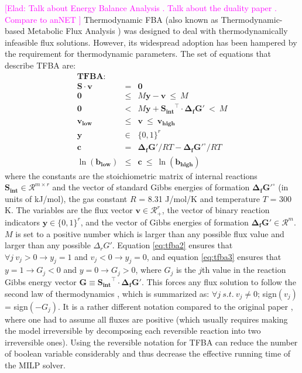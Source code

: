 \documentclass[twocolumn]{bmcart}%
\newcommand{\elad}[1]{{\textcolor{magenta}{[Elad: {#1}]}}}
\newcommand{\Sint}{\mathbf{S_{int}}}
\begin{document}
\elad{Talk about Energy Balance Analysis \cite{Beard2002-xt}. Talk about the duality paper \cite{Warren2007-wm}. Compare to anNET \cite{Matthias2008, Kuemmel2006}}
Thermodynamic FBA (also known as Thermo\-dynamic-based Metabolic Flux Analysis \cite{Henry2007-xp}) was designed to deal with thermodynamically infeasible flux solutions. However, its widespread adoption has been hampered by the requirement for thermodynamic parameters. The set of equations that describe TFBA are:
\begin{eqnarray}
\textbf{TFBA:} && \nonumber\\
\mathbf{S} \cdot \mathbf{v} &=& \mathbf{0}  \label{eq:tfba1} \\
\mathbf{0} &\leq& M \mathbf{y} - \mathbf{v} ~\leq~ M
\label{eq:tfba2} \\
\mathbf{0} &<& M \mathbf{y} + \Sint^\top \cdot \mathbf{\Delta_f G'} ~<~ M \label{eq:tfba3} \\
\mathbf{v_{low}} &\leq& \mathbf{v} ~\leq~ \mathbf{v_{high}} \label{eq:tfba4}\\
\mathbf{y} &\in& \{0, 1\}^r \label{eq:tfba5}\\
\mathbf{c} &=& \mathbf{\Delta_f G'}/RT - \mathbf{\Delta_f G'^\circ}/RT \label{eq:tfba6}\\
\ln(\mathbf{b_{low}}) &\leq& \mathbf{c} ~\leq~ \ln(\mathbf{b_{high}}) \label{eq:tfba7}
\end{eqnarray}
where the constants are the stoichiometric matrix of internal reactions $\Sint \in \mathcal{R}^{m \times r}$  and the vector of standard Gibbs energies of formation $\mathbf{\Delta_f G'^\circ}$ (in units of kJ/mol), the gas constant $R$ = 8.31 J/mol/K and temperature $T$ = 300 K. The variables are the flux vector $\mathbf{v} \in \mathcal{R}_{+}^{r}$, the vector of binary reaction indicators $\mathbf{y} \in \{0,1\}^{r}$, and the vector of Gibbs energies of formation $\mathbf{\Delta_f G'} \in \mathcal{R}^{m}$. $M$ is set to a positive number which is larger than any possible flux value and larger than any possible $\Delta_r G'$. Equation \ref{eq:tfba2} ensures that $\forall j~v_j > 0 \rightarrow y_j = 1$ and $v_j < 0 \rightarrow y_j = 0$, and equation \ref{eq:tfba3} ensures that $y = 1 \rightarrow G_j < 0$ and $y = 0 \rightarrow G_j > 0$, where $G_j$ is the $j$th value in the reaction Gibbs energy vector $\mathbf{G} \equiv \Sint^\top \cdot \mathbf{\Delta_f G'}$. This forces any flux solution to follow the second law of thermodynamics \cite{Hoppe2007-sw}, which is summarized as: $\forall j~s.t.~ v_j \neq 0$; sign$(v_j)$ = sign$(-G_j)$. It is a rather different notation compared to the original paper \cite{Henry2007-xp}, where one had to assume all fluxes are positive (which usually requires making the model irreversible by decomposing each reversible reaction into two irreversible ones). Using the reversible notation for TFBA can reduce the number of boolean variable considerably and thus decrease the effective running time of the MILP solver.
\end{document}
